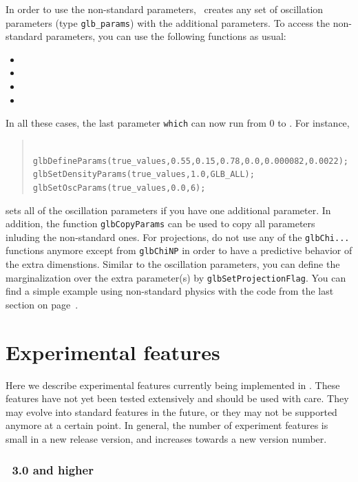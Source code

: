 In order to use the non-standard parameters, \GLOBES\ creates any set of oscillation parameters (type {\tt glb\_params})
with the additional parameters. To access the non-standard parameters, you can use the following functions as usual:
\begin{itemize}
\item
{}
\item
{}
\item
{}
\item
{}
\end{itemize}
In all these cases, the last parameter {\tt which} can now run from $0$ to . For instance,
\begin{quote}
{\tt
 glbDefineParams(true\_values,0.55,0.15,0.78,0.0,0.000082,0.0022); \\
 glbSetDensityParams(true\_values,1.0,GLB\_ALL); \\
 glbSetOscParams(true\_values,0.0,6);
}
\end{quote}
sets all of the oscillation parameters if you have one additional parameter. 
In addition, the function {\tt glbCopyParams}
can be used to copy all parameters inluding the non-standard ones. For projections,
do not use any of the {\tt glbChi...} functions anymore except from {\tt glbChiNP} in order to have a
predictive behavior of the extra dimenstions. Similar to the oscillation parameters, you can define
the marginalization over the extra parameter(s) by {\tt glbSetProjectionFlag}. You can find a simple
example using non-standard physics with the code from the last section on page~\pageref{ex:nsphysics}.



\chapter{Experimental features}
\label{chapt:experimental}

Here we describe experimental features currently being implemented in \GLOBES . These features have not yet been tested extensively and should be used with care. They may evolve into standard features in the future, or they may not be supported anymore at a certain point. In general, the number of experiment features is small in a new release version, and increases towards a new version number.

\subsection*{\GLOBES\ 3.0 and higher}

